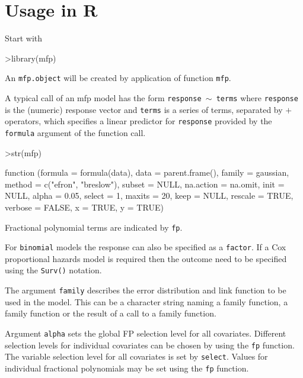 \documentclass[11pt]{article}
\begin{document}
\section{Usage in R}

Start with

\begin{Schunk}
\begin{Sinput}
>library(mfp)
\end{Sinput}
\end{Schunk}

An \texttt{mfp.object} will be created by application of function \texttt{mfp}. 

A typical call of an mfp model has the form \texttt{response $\sim$ terms} where \texttt{response} is the 
(numeric) response vector and \texttt{terms} is a series of terms, separated by $+$ operators,
which specifies a linear predictor for \texttt{response} provided by the \texttt{formula} 
argument of the function call.

\begin{Schunk}
\begin{Sinput}
>str(mfp)
\end{Sinput}
\begin{Soutput}
function (formula = formula(data), data = parent.frame(), family = gaussian, 
    method = c("efron", "breslow"), subset = NULL, na.action = na.omit, 
    init = NULL, alpha = 0.05, select = 1, maxits = 20, keep = NULL, 
    rescale = TRUE, verbose = FALSE, x = TRUE, y = TRUE)  
\end{Soutput}
\end{Schunk}

Fractional polynomial terms are indicated by \texttt{fp}. 

For \texttt{binomial} models the response can also be specified as a \texttt{factor}. 
If a Cox proportional hazards model is required then the outcome need to be specified using 
the \texttt{Surv()} notation. 

The argument \texttt{family} describes the error distribution and link function to
be used in the model. 
This can be a character string naming a family function, a family function or the result 
of a call to a family function. 

Argument \texttt{alpha} sets the global FP selection level for all covariates. 
Different selection levels for individual covariates can be chosen by using the \texttt{fp} function.
The variable selection level for all covariates is set by \texttt{select}. 
Values for individual fractional polynomials may be set using the \texttt{fp} function.
\end{document}
